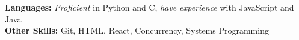 

\begin{cvparagraph}
    \textbf{Languages:} \emph{Proficient} in Python and C, \emph{have experience} with JavaScript and Java \\
    \textbf{Other Skills:} Git, HTML, React, Concurrency, Systems Programming
\end{cvparagraph}

